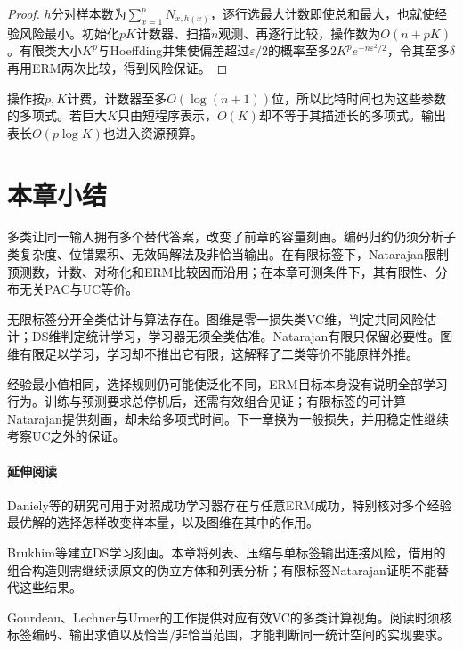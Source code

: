 \begin{proof}
$h$分对样本数为$\sum_{x=1}^pN_{x,h(x)}$，逐行选最大计数即使总和最大，也就使经验风险最小。初始化$pK$计数器、扫描$n$观测、再逐行比较，操作数为$O(n+pK)$。有限类大小$K^p$与Hoeffding并集使偏差超过$\varepsilon/2$的概率至多$2K^pe^{-n\varepsilon^2/2}$，令其至多$\delta$再用ERM两次比较，得到风险保证。
\end{proof}

操作按$p,K$计费，计数器至多$O(\log(n+1))$位，所以比特时间也为这些参数的多项式。若巨大$K$只由短程序表示，$O(K)$却不等于其描述长的多项式。输出表长$O(p\log K)$也进入资源预算。

\section{本章小结}
\label{sec:multiclass-learning-summary}

多类让同一输入拥有多个替代答案，改变了前章的容量刻画。编码归约仍须分析子类复杂度、位错累积、无效码解法及非恰当输出。在有限标签下，Natarajan限制预测数，计数、对称化和ERM比较因而沿用；在本章可测条件下，其有限性、分布无关PAC与UC等价。

无限标签分开全类估计与算法存在。图维是零一损失类VC维，判定共同风险估计；DS维判定统计学习，学习器无须全类估准。Natarajan有限只保留必要性。图维有限足以学习，学习却不推出它有限，这解释了二类等价不能原样外推。

经验最小值相同，选择规则仍可能使泛化不同，ERM目标本身没有说明全部学习行为。训练与预测要求总停机后，还需有效组合见证；有限标签的可计算Natarajan提供刻画，却未给多项式时间。下一章换为一般损失，并用稳定性继续考察UC之外的保证。

\paragraph{延伸阅读}
Daniely等的研究可用于对照成功学习器存在与任意ERM成功，特别核对多个经验最优解的选择怎样改变样本量，以及图维在其中的作用。

Brukhim等建立DS学习刻画。本章将列表、压缩与单标签输出连接风险，借用的组合构造则需继续读原文的伪立方体和列表分析；有限标签Natarajan证明不能替代这些结果。

Gourdeau、Lechner与Urner的工作提供对应有效VC的多类计算视角。阅读时须核标签编码、输出求值以及恰当/非恰当范围，才能判断同一统计空间的实现要求。